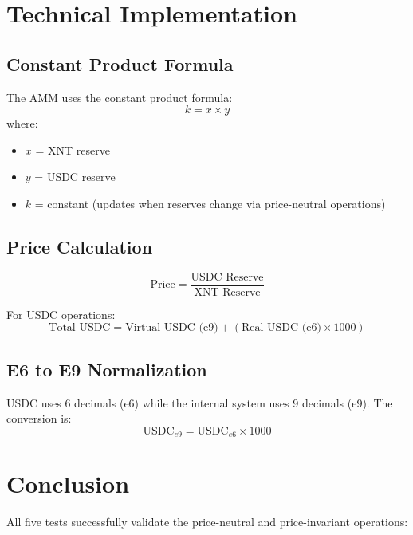 \documentclass[11pt,a4paper]{article}
\begin{document}
\section{Technical Implementation}

\subsection{Constant Product Formula}
The AMM uses the constant product formula:
\begin{equation}
k = x \times y
\end{equation}
where:
\begin{itemize}
    \item $x$ = XNT reserve
    \item $y$ = USDC reserve
    \item $k$ = constant (updates when reserves change via price-neutral operations)
\end{itemize}

\subsection{Price Calculation}
\begin{equation}
\text{Price} = \frac{\text{USDC Reserve}}{\text{XNT Reserve}}
\end{equation}

For USDC operations:
\begin{equation}
\text{Total USDC} = \text{Virtual USDC (e9)} + (\text{Real USDC (e6)} \times 1000)
\end{equation}

\subsection{E6 to E9 Normalization}
USDC uses 6 decimals (e6) while the internal system uses 9 decimals (e9). The conversion is:
\begin{equation}
\text{USDC}_{e9} = \text{USDC}_{e6} \times 1000
\end{equation}

\newpage

\section{Conclusion}

All five tests successfully validate the price-neutral and price-invariant operations:
\end{document}

